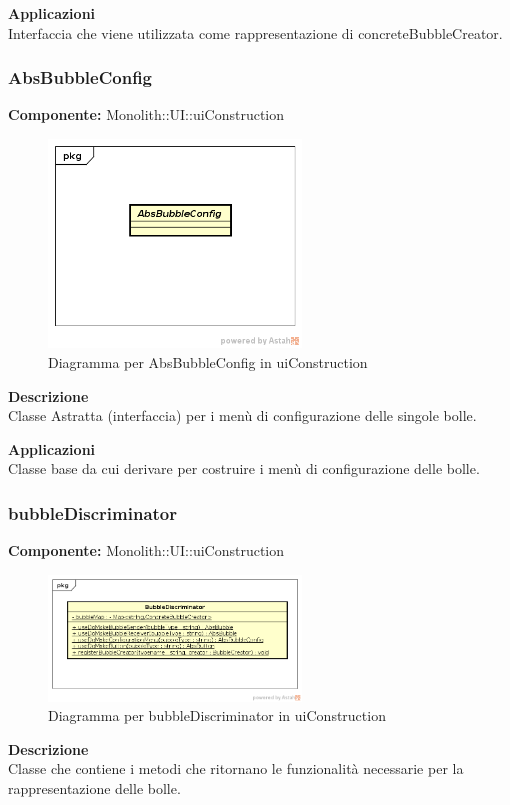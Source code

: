 \textbf{Applicazioni}\\
Interfaccia che viene utilizzata come rappresentazione di concreteBubbleCreator. 


\clearpage

\subsubsection{AbsBubbleConfig}
\textbf{Componente:}  Monolith::UI::uiConstruction\\
   \FloatBarrier
   \begin{figure}[ht]
   \centering
   \includegraphics[width=0.6\textwidth]{img/single-AbsBubbleConfig}
   \caption{{Diagramma per AbsBubbleConfig in uiConstruction}}
\end{figure}
\FloatBarrier
\textbf{Descrizione}\\
Classe Astratta (interfaccia) per i menù di configurazione delle singole bolle. 


\textbf{Applicazioni}\\
Classe base da cui derivare per costruire i menù di configurazione delle bolle. 


\clearpage

\subsubsection{bubbleDiscriminator}
\textbf{Componente:}  Monolith::UI::uiConstruction\\
   \FloatBarrier
   \begin{figure}[ht]
   \centering
   \includegraphics[width=0.6\textwidth]{img/single-bubbleDiscriminator}
   \caption{{Diagramma per bubbleDiscriminator in uiConstruction}}
\end{figure}
\FloatBarrier
\textbf{Descrizione}\\
Classe che contiene i metodi che ritornano le funzionalità necessarie per la rappresentazione delle bolle.

